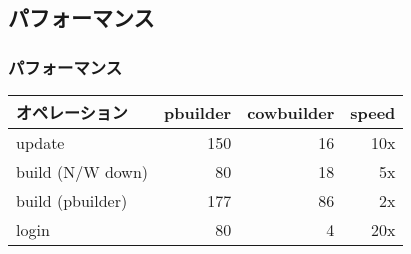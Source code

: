 \documentclass[cjk,dvipdfmx]{beamer}
\begin{document}
\subsection{パフォーマンス}
\begin{frame}
 \frametitle{パフォーマンス}
\begin{center}
 \begin{tabular}[t]{@{\vrule width 1pt}l|r|r|r@{\ \vrule width 1pt}}
 \hline
 \hline
 オペレーション & pbuilder & cowbuilder & speed \\
 \hline
 update & 150  & 16 & 10x \\
 build (N/W down) & 80 & 18 & 5x \\
 build (pbuilder) & 177 & 86 & 2x\\
 login & 80 & 4 & 20x\\
 \hline
 \hline
 \end{tabular}
\end{center}

\end{frame}
\end{document}
